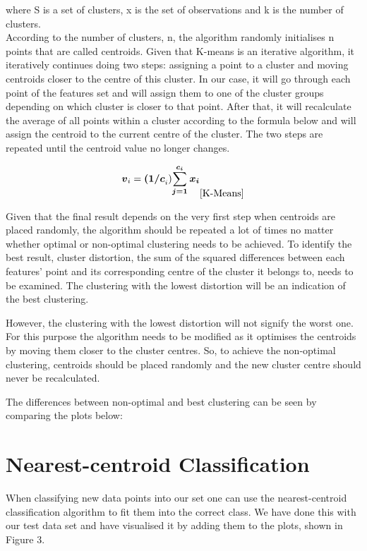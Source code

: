 \documentclass[a4paper, 11pt]{article}
\begin{document}
where
S is a set of clusters, x is the set of observations and k is the number of clusters. \cite{wikiKMeans}\\

According to the number of clusters, n, the algorithm randomly initialises n points that are called centroids. Given that K-means is an iterative algorithm, it iteratively continues doing two steps: assigning a point to a cluster and moving centroids closer to the centre of this cluster. In our case, it will go through each point of the features set and will assign them to one of the cluster groups depending on which cluster is closer to that point. After that, it will recalculate the average of all points within a cluster according to the formula below and will assign the centroid to the current centre of the cluster. The two steps are repeated until the centroid value no longer changes.

\begin{equation*}
  \boldsymbol{v}_i = \boldsymbol{(1/c}_i) \boldsymbol{\sum_{j=1}^{c_i} x_i}_{\cite{K-Means}}
\end{equation*}

Given that the final result depends on the very first step when centroids are placed randomly, the algorithm should be repeated a lot of times no matter whether optimal or non-optimal clustering needs to be achieved. To identify the best result, cluster distortion, the sum of the squared differences between each features’ point and its corresponding centre of the cluster it belongs to, needs to be examined. The clustering with the lowest distortion will be an indication of the best clustering. \cite{BigData}


However, the clustering with the lowest distortion will not signify the worst one. For this purpose the algorithm needs to be modified as it optimises the centroids by moving them closer to the cluster centres. So, to achieve the non-optimal clustering, centroids should be placed randomly and the new cluster centre should never be recalculated. 

The differences between non-optimal and best clustering can be seen by comparing the plots below:

\section*{\vspace{-0.35cm}Nearest-centroid Classification}
When classifying new data points into our set one can use the nearest-centroid classification algorithm to fit them into the correct class. We have done this with our test data set and have visualised it by adding them to the plots, shown in Figure 3.
\end{document}
